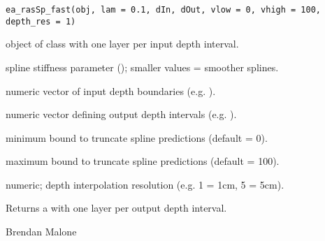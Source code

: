 \documentclass[a4paper]{book}
\begin{document}
%
\begin{Usage}
\begin{verbatim}
ea_rasSp_fast(obj, lam = 0.1, dIn, dOut, vlow = 0, vhigh = 100, depth_res = 1)
\end{verbatim}
\end{Usage}
%
\begin{Arguments}
\begin{ldescription}
\item[\code{obj}] object of class  with one layer per input depth interval.
\item[\code{lam}] spline stiffness parameter (\eqn{\lambda}{}); smaller values = smoother splines.
\item[\code{dIn}] numeric vector of input depth boundaries (e.g. ).
\item[\code{dOut}] numeric vector defining output depth intervals (e.g. ).
\item[\code{vlow}] minimum bound to truncate spline predictions (default = 0).
\item[\code{vhigh}] maximum bound to truncate spline predictions (default = 100).
\item[\code{depth\_res}] numeric; depth interpolation resolution (e.g. 1 = 1cm, 5 = 5cm).
\end{ldescription}
\end{Arguments}
%
\begin{Value}
Returns a  with one layer per output depth interval.
\end{Value}
%
\begin{Author}
Brendan Malone
\end{Author}
%
\end{document}

